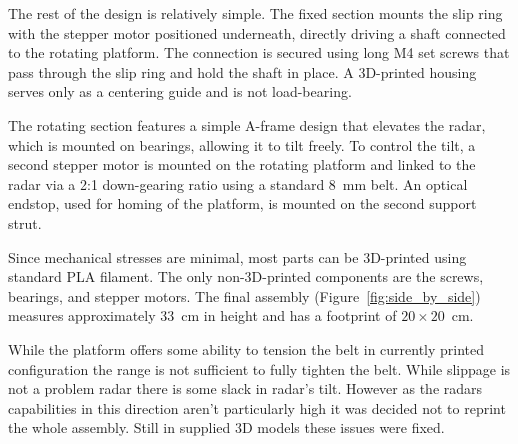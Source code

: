 The rest of the design is relatively simple.
The fixed section mounts the slip ring with the stepper motor positioned underneath, directly driving a shaft connected to the rotating platform.
The connection is secured using long M4 set screws that pass through the slip ring and hold the shaft in place.
A 3D-printed housing serves only as a centering guide and is not load-bearing.

The rotating section features a simple A-frame design that elevates the radar, which is mounted on bearings, allowing it to tilt freely.
To control the tilt, a second stepper motor is mounted on the rotating platform and linked to the radar via a 2:1 down-gearing ratio using a standard 8~mm belt.
An optical endstop, used for homing of the platform, is mounted on the second support strut.

Since mechanical stresses are minimal, most parts can be 3D-printed using standard PLA filament.
The only non-3D-printed components are the screws, bearings, and stepper motors.
The final assembly (Figure~\ref{fig:side_by_side}) measures approximately 33~cm in height and has a footprint of $20\times20$~cm.

While the platform offers some ability to tension the belt in currently printed configuration the range is not sufficient to fully tighten the belt.
While slippage is not a problem radar there is some slack in radar's tilt.
However as the radars capabilities in this direction aren't particularly high it was decided not to reprint the whole assembly.
Still in supplied 3D models these issues were fixed.

